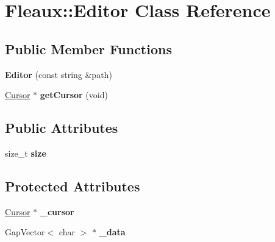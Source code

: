 \hypertarget{classFleaux_1_1Editor}{}\section{Fleaux\+:\+:Editor Class Reference}
\label{classFleaux_1_1Editor}
\subsection*{Public Member Functions}
\begin{DoxyCompactItemize}
\item 
\hypertarget{classFleaux_1_1Editor_a023e2569b82e4299d02ddbd0a912fc5e}{}{\bfseries Editor} (const string \&path)\label{classFleaux_1_1Editor_a023e2569b82e4299d02ddbd0a912fc5e}

\item 
\hypertarget{classFleaux_1_1Editor_ab5e473c0bb4afb7b50951b4afa04b829}{}\hyperlink{classFleaux_1_1Cursor}{Cursor} $\ast$ {\bfseries get\+Cursor} (void)\label{classFleaux_1_1Editor_ab5e473c0bb4afb7b50951b4afa04b829}

\end{DoxyCompactItemize}
\subsection*{Public Attributes}
\begin{DoxyCompactItemize}
\item 
\hypertarget{classFleaux_1_1Editor_ab86c4d580c9e59bf5875c74064f2ff3c}{}size\+\_\+t {\bfseries size}\label{classFleaux_1_1Editor_ab86c4d580c9e59bf5875c74064f2ff3c}

\end{DoxyCompactItemize}
\subsection*{Protected Attributes}
\begin{DoxyCompactItemize}
\item 
\hypertarget{classFleaux_1_1Editor_a919d3fb5e0d31bcb9ab64814f380ddfb}{}\hyperlink{classFleaux_1_1Cursor}{Cursor} $\ast$ {\bfseries \+\_\+cursor}\label{classFleaux_1_1Editor_a919d3fb5e0d31bcb9ab64814f380ddfb}

\item 
\hypertarget{classFleaux_1_1Editor_a40a9c440093c80483870179afd3720ba}{}Gap\+Vector$<$ char $>$ $\ast$ {\bfseries \+\_\+data}\label{classFleaux_1_1Editor_a40a9c440093c80483870179afd3720ba}

\end{DoxyCompactItemize}
